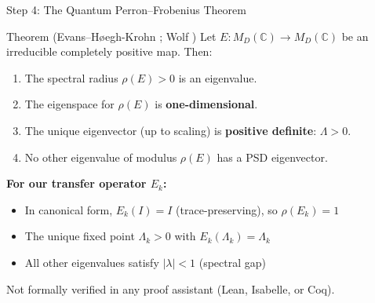 \documentclass[aspectratio=169,10pt]{beamer}
\begin{document}
\begin{frame}{Step 4: The Quantum Perron--Frobenius Theorem}

\begin{block}{Theorem (Evans--H{\o}egh-Krohn \cite{Evans1978Spectral}; Wolf \cite{Wolf2012Quantum})}
Let $E : M_D(\mathbb{C}) \to M_D(\mathbb{C})$ be an \alert{irreducible completely positive} map. Then:
\begin{enumerate}\itemsep0pt
  \item The spectral radius $\rho(E) > 0$ is an eigenvalue.
  \item The eigenspace for $\rho(E)$ is \textbf{one-dimensional}.
  \item The unique eigenvector (up to scaling) is \textbf{positive definite}: $\Lambda > 0$.
  \item No other eigenvalue of modulus $\rho(E)$ has a PSD eigenvector.
\end{enumerate}
\end{block}

\vspace{0.2em}
\textbf{For our transfer operator $E_k$:}
\begin{itemize}\itemsep0pt
  \item In canonical form, $E_k(I) = I$ (trace-preserving), so $\rho(E_k) = 1$
  \item The unique fixed point $\Lambda_k > 0$ with $E_k(\Lambda_k) = \Lambda_k$
  \item \alert{All other eigenvalues satisfy $|\lambda| < 1$} (spectral gap)
\end{itemize}

\vspace{0.2em}
\begin{center}
\textcolor{softred}{Not formally verified in any proof assistant (Lean, Isabelle, or Coq).}
\end{center}
\end{frame}
\end{document}
